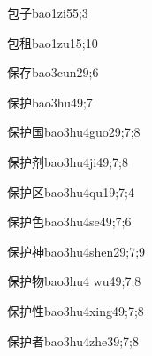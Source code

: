 \begin{verbete}{包子}{bao1zi5}{5;3}
\end{verbete}

\begin{verbete}{包租}{bao1zu1}{5;10}
\end{verbete}

\begin{verbete}{保存}{bao3cun2}{9;6}
\end{verbete}

\begin{verbete}{保护}{bao3hu4}{9;7}
\end{verbete}

\begin{verbete}{保护国}{bao3hu4guo2}{9;7;8}
\end{verbete}

\begin{verbete}{保护剂}{bao3hu4ji4}{9;7;8}
\end{verbete}

\begin{verbete}{保护区}{bao3hu4qu1}{9;7;4}
\end{verbete}

\begin{verbete}{保护色}{bao3hu4se4}{9;7;6}
\end{verbete}

\begin{verbete}{保护神}{bao3hu4shen2}{9;7;9}
\end{verbete}

\begin{verbete}{保护物}{bao3hu4 wu4}{9;7;8}
\end{verbete}

\begin{verbete}{保护性}{bao3hu4xing4}{9;7;8}
\end{verbete}

\begin{verbete}{保护者}{bao3hu4zhe3}{9;7;8}
\end{verbete}

